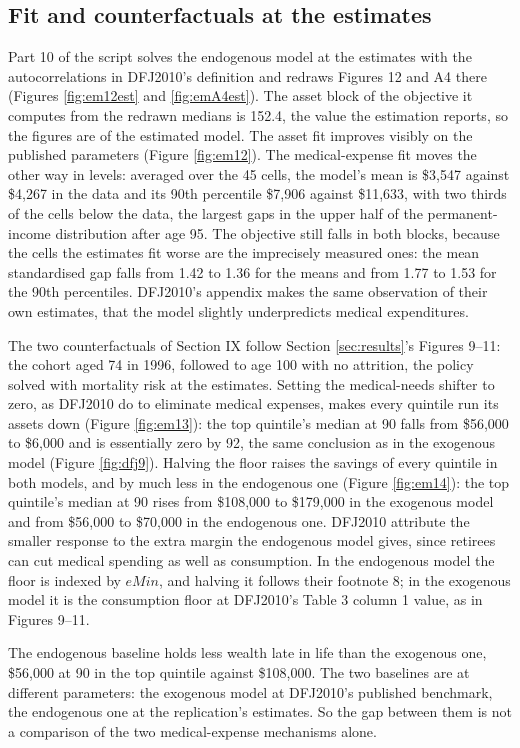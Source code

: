 \documentclass[11pt,fleqn]{article}
\begin{document}
\subsection{Fit and counterfactuals at the estimates}
Part 10 of the script solves the endogenous model at the estimates with the autocorrelations in DFJ2010's definition and redraws Figures 12 and A4 there (Figures \ref{fig:em12est} and \ref{fig:emA4est}). The asset block of the objective it computes from the redrawn medians is 152.4, the value the estimation reports, so the figures are of the estimated model. The asset fit improves visibly on the published parameters (Figure \ref{fig:em12}). The medical-expense fit moves the other way in levels: averaged over the 45 cells, the model's mean is \$3,547 against \$4,267 in the data and its 90th percentile \$7,906 against \$11,633, with two thirds of the cells below the data, the largest gaps in the upper half of the permanent-income distribution after age 95. The objective still falls in both blocks, because the cells the estimates fit worse are the imprecisely measured ones: the mean standardised gap falls from 1.42 to 1.36 for the means and from 1.77 to 1.53 for the 90th percentiles. DFJ2010's appendix makes the same observation of their own estimates, that the model slightly underpredicts medical expenditures.

The two counterfactuals of Section IX follow Section \ref{sec:results}'s Figures 9--11: the cohort aged 74 in 1996, followed to age 100 with no attrition, the policy solved with mortality risk at the estimates. Setting the medical-needs shifter to zero, as DFJ2010 do to eliminate medical expenses, makes every quintile run its assets down (Figure \ref{fig:em13}): the top quintile's median at 90 falls from \$56,000 to \$6,000 and is essentially zero by 92, the same conclusion as in the exogenous model (Figure \ref{fig:dfj9}). Halving the floor raises the savings of every quintile in both models, and by much less in the endogenous one (Figure \ref{fig:em14}): the top quintile's median at 90 rises from \$108,000 to \$179,000 in the exogenous model and from \$56,000 to \$70,000 in the endogenous one. DFJ2010 attribute the smaller response to the extra margin the endogenous model gives, since retirees can cut medical spending as well as consumption. In the endogenous model the floor is indexed by $eMin$, and halving it follows their footnote 8; in the exogenous model it is the consumption floor at DFJ2010's Table 3 column 1 value, as in Figures 9--11.

The endogenous baseline holds less wealth late in life than the exogenous one, \$56,000 at 90 in the top quintile against \$108,000. The two baselines are at different parameters: the exogenous model at DFJ2010's published benchmark, the endogenous one at the replication's estimates. So the gap between them is not a comparison of the two medical-expense mechanisms alone.
\end{document}
